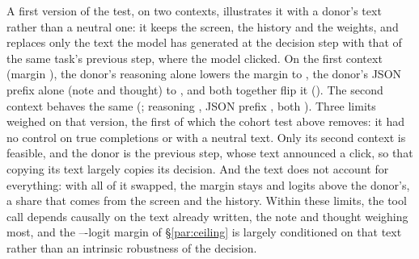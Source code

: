 A first version of the test, on two \fsp{} contexts, illustrates it with a donor's text rather than a neutral one: it keeps the screen, the history and the weights, and replaces only the text the model has generated at the decision step with that of the same task's previous step, where the model clicked. On the first \fsp{} context (margin \ancAOrig), the donor's reasoning alone lowers the margin to \ancAReason, the donor's JSON prefix alone (note and thought) to \ancAJson, and both together flip it (\ancABoth). The second context behaves the same (\ancBOrig; reasoning \ancBReason, JSON prefix \ancBJson, both \ancBBoth). %
Three limits weighed on that version, the first of which the cohort test above removes: it had no control on true completions or with a neutral text. Only its second context is feasible, and the donor is the previous step, whose text announced a click, so that copying its text largely copies its decision. And the text does not account for everything: with all of it swapped, the margin stays \ancAScreen{} and \ancBScreen{} logits above the donor's, a share that comes from the screen and the history. Within these limits, the tool call depends causally on the text already written, the note and thought weighing most, and the \margPosMin--\margPosMax-logit margin of \S\ref{par:ceiling} is largely conditioned on that text rather than an intrinsic robustness of the decision.
